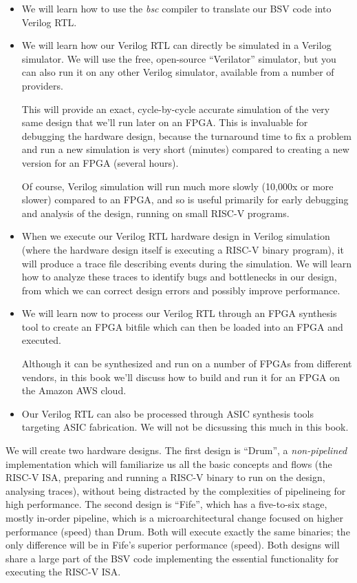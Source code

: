 \begin{itemize}
\item We will learn how to use the \emph{bsc} compiler to translate
    our BSV code into Verilog RTL.

\item We will learn how our Verilog RTL can directly be simulated in a
    Verilog simulator.  We will use the free, open-source
    ``Verilator'' simulator, but you can also run it on any other
    Verilog simulator, available from a number of providers.

    This will provide an exact, cycle-by-cycle accurate simulation of
    the very same design that we'll run later on an FPGA.  This is
    invaluable for debugging the hardware design, because the
    turnaround time to fix a problem and run a new simulation is very
    short (minutes) compared to creating a new version for an FPGA
    (several hours).

    Of course, Verilog simulation will run much more slowly (10,000x
    or more slower) compared to an FPGA, and so is useful primarily
    for early debugging and analysis of the design, running on small
    RISC-V programs.

\item When we execute our Verilog RTL hardware design in Verilog
    simulation (where the hardware design itself is executing a RISC-V
    binary program), it will produce a trace file describing events
    during the simulation.  We will learn how to analyze these traces
    to identify bugs and bottlenecks in our design, from which we can
    correct design errors and possibly improve performance.

\item We will learn now to process our Verilog RTL through an FPGA
    synthesis tool to create an FPGA bitfile which can then be loaded
    into an FPGA and executed.

    Although it can be synthesized and run on a number of FPGAs from
    different vendors, in this book we'll discuss how to build and run
    it for an FPGA on the Amazon AWS cloud.

\item Our Verilog RTL can also be processed through ASIC synthesis
    tools targeting ASIC fabrication.  We will not be dicsussing this
    much in this book.

\end{itemize}

We will create two hardware designs.  The first design is
``Drum'', a \emph{non-pipelined} implementation which will
familiarize us all the basic concepts and flows (the RISC-V ISA,
preparing and running a RISC-V binary to run on the design, analysing
traces), without being distracted by the complexities of pipelineing
for high performance.  The second design is ``Fife'', which has a
five-to-six stage, mostly in-order pipeline, which is a
microarchitectural change focused on higher performance (speed) than
Drum.  Both will execute exactly the same binaries; the only
difference will be in Fife's superior performance (speed).  Both
designs will share a large part of the BSV code implementing the
essential functionality for executing the RISC-V ISA.

